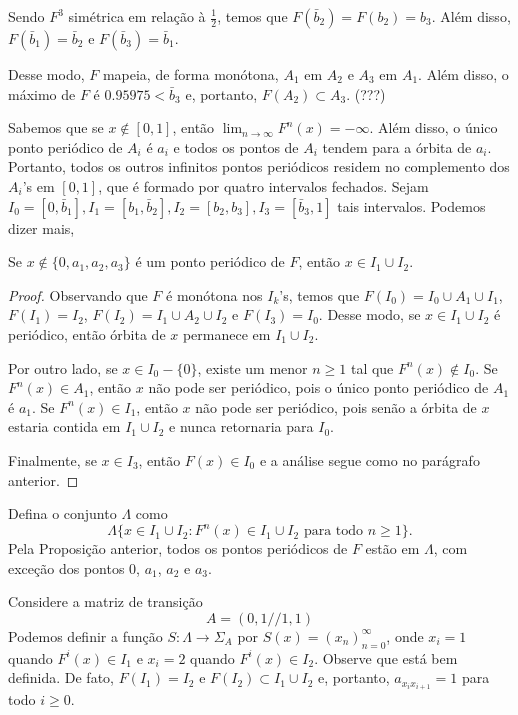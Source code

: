 Sendo $F^3$ simétrica em relação à $\frac{1}{2}$, temos que $F(\bar{b}_2) = F(b_2) = b_3$. Além disso, $F(\bar{b}_1) = \bar{b}_2$ e $F(\bar{b}_3) = \bar{b}_1$.

Desse modo, $F$ mapeia, de forma monótona, $A_1$ em $A_2$ e $A_3$ em $A_1$. Além disso, o máximo de $F$ é $0.95975 < \bar{b}_3$ e, portanto, $F(A_2) \subset A_3$. (???)

Sabemos que se $x \notin [0, 1]$, então $\lim_{n \to \infty} F^n(x) = -\infty$. Além disso, o único ponto periódico de $A_i$ é $a_i$ e todos os pontos de $A_i$ tendem para a órbita de $a_i$. Portanto, todos os outros infinitos pontos periódicos residem no complemento dos $A_i$'s em $[0, 1]$, que é formado por quatro intervalos fechados. Sejam $I_0 = [0, \bar{b}_1], I_1 = [b_1, \bar{b}_2], I_2 = [b_2, b_3], I_3 = [\bar{b}_3, 1]$ tais intervalos. Podemos dizer mais,

\begin{proposition}
Se $x \notin \{ 0, a_1, a_2, a_3 \}$ é um ponto periódico de $F$, então $x \in I_1 \cup I_2$.
\end{proposition}


\begin{proof}
Observando que $F$ é monótona nos $I_k$'s, temos que $F(I_0) = I_0 \cup A_1 \cup I_1$, $F(I_1) = I_2$, $F(I_2) = I_1 \cup A_2 \cup I_2$ e $F(I_3) = I_0$. Desse modo, se $x \in I_1 \cup I_2$ é periódico, então órbita de $x$ permanece em $I_1 \cup I_2$.

Por outro lado, se $x \in I_0 - \{ 0 \}$, existe um menor $n \geq 1$ tal que $F^n(x) \notin I_0$. Se $F^n(x) \in A_1$, então $x$ não pode ser periódico, pois o único ponto periódico de $A_1$ é $a_1$. Se $F^n(x) \in I_1$, então $x$ não pode ser periódico, pois senão a órbita de $x$ estaria contida em $I_1 \cup I_2$ e nunca retornaria para $I_0$.

Finalmente, se $x \in I_3$, então $F(x) \in I_0$ e a análise segue como no parágrafo anterior.
\end{proof}

Defina o conjunto $\Lambda$ como
$$\Lambda \{ x \in I_1 \cup I_2 : F^n(x) \in I_1 \cup I_2 \textrm{ para todo } n \geq 1 \}.$$
Pela Proposição anterior, todos os pontos periódicos de $F$ estão em $\Lambda$, com exceção dos pontos $0$, $a_1$, $a_2$ e $a_3$.

Considere a matriz de transição
$$A = (0, 1 // 1, 1)$$
Podemos definir a função $S: \Lambda \to \Sigma_A$ por $S(x) = (x_n)_{n=0}^\infty$, onde $x_i = 1$ quando $F^i(x) \in I_1$ e $x_i = 2$ quando $F^i(x) \in I_2$. Observe que está bem definida. De fato, $F(I_1) = I_2$ e $F(I_2) \subset I_1 \cup I_2$ e, portanto, $a_{x_i x_{i+1}} = 1$ para todo $i \geq 0$. 

